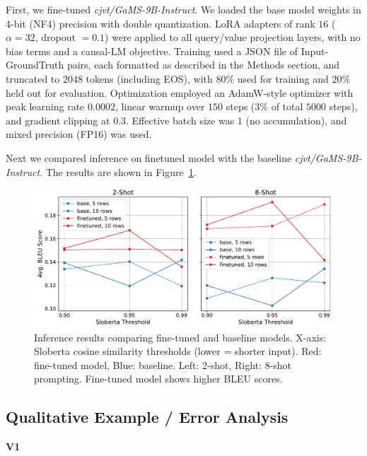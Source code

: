 \documentclass[fleqn,moreauthors,10pt]{ds_report}
\begin{document}
First, we fine-tuned \textit{cjvt/GaMS-9B-Instruct}. We loaded the base model weights in 4-bit (NF4) precision with
double quantization. LoRA adapters of rank $16$ ($\alpha = 32$, dropout $=0.1$) were applied to all query/value
projection layers, with no bias terms and a causal-LM objective.
Training used a JSON file of Input-GroundTruth pairs, each formatted as described in the Methods section, and
truncated to $2048$ tokens (including EOS), with $80\%$ used for training and $20\%$ held out for evaluation.
Optimization employed an AdamW-style optimizer with peak learning rate $0.0002$, linear warmup over $150$ steps
(3\% of total $5000$ steps), and gradient clipping at $0.3$. Effective batch size was $1$ (no accumulation), and
mixed precision (FP16) was used.

Next we compared inference on finetuned model with the baseline \textit{cjvt/GaMS-9B-Instruct}. The results are
shown in Figure~\ref{fig:inf_res}.

\begin{figure}[ht]
    \centering
    \includegraphics[width=\columnwidth]{fig/infer_res.pdf}
    \caption{Inference results comparing fine-tuned and baseline models.
    X-axis: Sloberta cosine similarity thresholds (lower = shorter input).
    Red: fine-tuned model, Blue: baseline.
    Left: 2-shot, Right: 8-shot prompting.
    Fine-tuned model shows higher BLEU scores.}
    \label{fig:inf_res}
\end{figure}

\subsection{Qualitative Example / Error Analysis}
\label{subsec:qualitative}

\vspace{1em}
\noindent \textbf{V1}
\vspace{0.5em}
\end{document}
